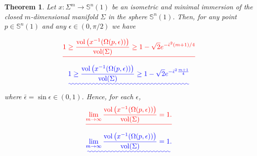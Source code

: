 \documentclass{amsart}
\newtheorem{theorem}{Theorem}[section]
\theoremstyle{definition}
\theoremstyle{remark}
\providecommand{\DIFadd}[1]{{\protect\color{blue}\uwave{#1}}} %
\providecommand{\DIFdel}[1]{{\protect\color{red}\sout{#1}}}                      %
\providecommand{\DIFaddbegin}{} %
\providecommand{\DIFaddend}{} %
\providecommand{\DIFdelbegin}{} %
\providecommand{\DIFdelend}{} %
\begin{document}
\begin{theorem}\DIFaddbegin \label{mainInt}
\DIFaddend Let  $x: \Sigma^m \to \mathbb{S}^n(1)$ be an isometric and minimal immersion of the closed $m$-dimensional manifold $\Sigma$ in the sphere  $\mathbb{S}^n(1)$. Then, for any point $p \in \mathbb{S}^n(1)$ and any  $\epsilon \in (0,\pi/2)$ we have 

\DIFdelbegin \begin{displaymath}
\DIFdel{1\geq \frac{{\rm vol}\left(x^{-1}(\Omega(p,\epsilon))\right)}{{\rm vol}(\Sigma)}\geq  1- \sqrt{2}e^{-\bar\epsilon^2(m+1)/4}
}\end{displaymath}%
\DIFdelend \DIFaddbegin \begin{equation}\DIFadd{\label{eq4}
1\geq \frac{{\rm vol}\left(x^{-1}(\Omega(p,\epsilon))\right)}{{\rm vol}(\Sigma)}\geq  1- \sqrt{2}e^{-\bar\epsilon^2\frac{m+1}{4}}
}\end{equation}\DIFaddend 
where $\bar\epsilon=\sin\epsilon \in (0,1)$. Hence, for each  $\epsilon$,
\DIFdelbegin \begin{displaymath}
\DIFdel{\lim_{m\to\infty}\frac{{\rm vol}\left(x^{-1}(\Omega(p,\epsilon))\right)}{{\rm vol}(\Sigma)}=1.
}\end{displaymath}%
\DIFdelend \DIFaddbegin \begin{equation}\DIFadd{\label{eq5}
\lim_{m\to\infty}\frac{{\rm vol}\left(x^{-1}(\Omega(p,\epsilon))\right)}{{\rm vol}(\Sigma)}=1.
}\end{equation}\DIFaddend 


\end{theorem}
\end{document}
